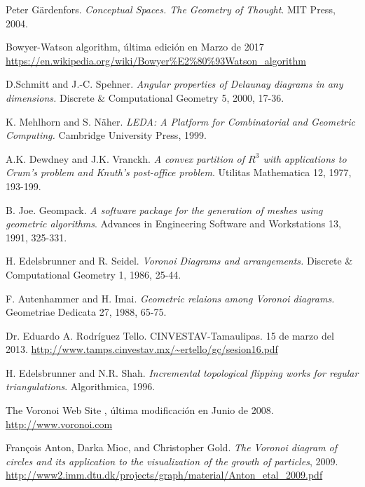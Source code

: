 \documentclass[a4paper,11pt]{book}
\begin{document}
\begin{thebibliography}{1}
 Peter Gärdenfors. \emph{Conceptual Spaces. The Geometry of Thought}. MIT Press, 2004.

 Bowyer-Watson algorithm, última edición en Marzo de 2017 \url{https://en.wikipedia.org/wiki/Bowyer%E2%80%93Watson_algorithm}

 D.Schmitt and J.-C. Spehner. \emph{Angular properties of Delaunay diagrams in any dimensions.} Discrete \& Computational Geometry 5, 2000, 17-36.

 K. Mehlhorn and S. Näher. \emph{LEDA: A Platform for Combinatorial and Geometric Computing.} Cambridge University Press, 1999.

 A.K. Dewdney and J.K. Vranckh. \emph{A convex partition of $R^3$ with applications to Crum's problem and Knuth's post-office problem}. Utilitas Mathematica 12, 1977, 193-199.

 B. Joe. Geompack. \emph{A software package for the generation of meshes using geometric algorithms}. Advances in Engineering Software and Workstations 13, 1991, 325-331.

 H. Edelsbrunner and R. Seidel. \emph{Voronoi Diagrams and arrangements.} Discrete \& Computational Geometry 1, 1986, 25-44.

 F. Autenhammer and H. Imai. \emph{Geometric relaions among Voronoi diagrams.} Geometriae Dedicata 27, 1988, 65-75.

 Dr. Eduardo A. Rodríguez Tello. CINVESTAV-Tamaulipas. 15 de marzo del 2013.
\url{http://www.tamps.cinvestav.mx/~ertello/gc/sesion16.pdf}

 H. Edelsbrunner and N.R. Shah. \emph{Incremental topological flipping works for regular triangulations}. Algorithmica, 1996.

 The Voronoi Web Site , última modificación en Junio de 2008. \url{http://www.voronoi.com}

 François Anton, Darka Mioc, and Christopher Gold. \emph{The Voronoi diagram of circles and its application to the visualization of the growth of particles}, 2009. \url{http://www2.imm.dtu.dk/projects/graph/material/Anton_etal_2009.pdf}
\end{thebibliography}



%



\end{document}
